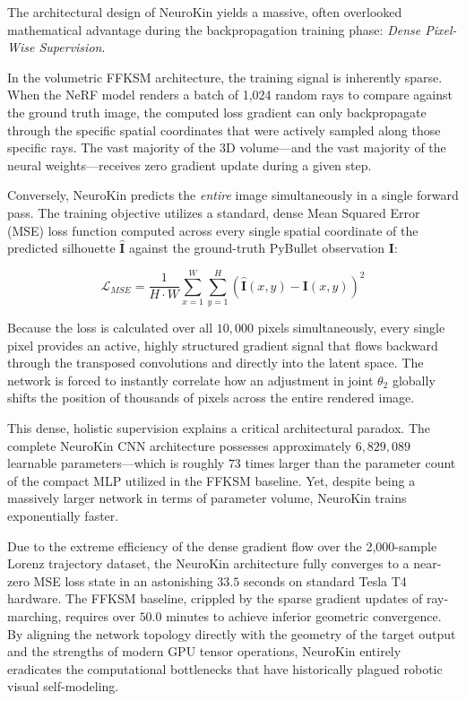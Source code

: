 \documentclass[12pt,a4paper,oneside]{report}
\begin{document}
The architectural design of NeuroKin yields a massive, often overlooked mathematical advantage during the backpropagation training phase: \textit{Dense Pixel-Wise Supervision}.

In the volumetric FFKSM architecture, the training signal is inherently sparse. When the NeRF model renders a batch of 1,024 random rays to compare against the ground truth image, the computed loss gradient can only backpropagate through the specific spatial coordinates that were actively sampled along those specific rays. The vast majority of the 3D volume—and the vast majority of the neural weights—receives zero gradient update during a given step. 

Conversely, NeuroKin predicts the \textit{entire} image simultaneously in a single forward pass. The training objective utilizes a standard, dense Mean Squared Error (MSE) loss function computed across every single spatial coordinate of the predicted silhouette $\hat{\mathbf{I}}$ against the ground-truth PyBullet observation $\mathbf{I}$:

\begin{equation}
\mathcal{L}_{MSE} = \frac{1}{H \cdot W} \sum_{x=1}^{W} \sum_{y=1}^{H} \left( \hat{\mathbf{I}}(x, y) - \mathbf{I}(x, y) \right)^2
\end{equation}

Because the loss is calculated over all $10,000$ pixels simultaneously, every single pixel provides an active, highly structured gradient signal that flows backward through the transposed convolutions and directly into the latent space. The network is forced to instantly correlate how an adjustment in joint $\theta_2$ globally shifts the position of thousands of pixels across the entire rendered image.

This dense, holistic supervision explains a critical architectural paradox. The complete NeuroKin CNN architecture possesses approximately $6,829,089$ learnable parameters—which is roughly $73$ times larger than the parameter count of the compact MLP utilized in the FFKSM baseline. Yet, despite being a massively larger network in terms of parameter volume, NeuroKin trains exponentially faster. 

Due to the extreme efficiency of the dense gradient flow over the 2,000-sample Lorenz trajectory dataset, the NeuroKin architecture fully converges to a near-zero MSE loss state in an astonishing $33.5$ seconds on standard Tesla T4 hardware. The FFKSM baseline, crippled by the sparse gradient updates of ray-marching, requires over $50.0$ minutes to achieve inferior geometric convergence. By aligning the network topology directly with the geometry of the target output and the strengths of modern GPU tensor operations, NeuroKin entirely eradicates the computational bottlenecks that have historically plagued robotic visual self-modeling.
\end{document}
